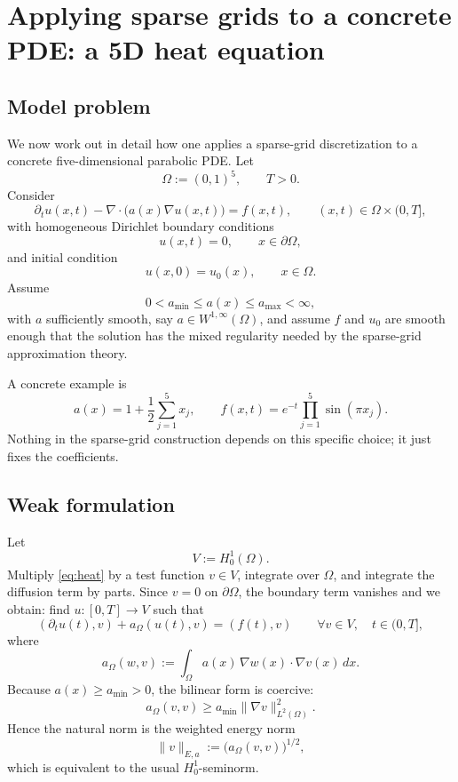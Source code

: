 \documentclass[11pt,a4paper]{report}
\begin{document}
\chapter{Applying sparse grids to a concrete PDE: a 5D heat equation}

\section{Model problem}

We now work out in detail how one applies a sparse-grid discretization to a concrete five-dimensional parabolic PDE. Let
$$
\Omega := (0,1)^5,
\qquad
T>0.
$$
Consider
\begin{equation}
\partial_t u(x,t) - \nabla\cdot\bigl(a(x)\nabla u(x,t)\bigr) = f(x,t),
\qquad (x,t)\in \Omega\times(0,T],
\label{eq:heat}
\end{equation}
with homogeneous Dirichlet boundary conditions
$$
u(x,t)=0,
\qquad x\in\partial\Omega,
$$
and initial condition
$$
u(x,0)=u_0(x), \qquad x\in\Omega.
$$
Assume
$$
0<a_{\min}\le a(x)\le a_{\max}<\infty,
$$
with $a$ sufficiently smooth, say $a\in W^{1,\infty}(\Omega)$, and assume $f$ and $u_0$ are smooth enough that the solution has the mixed regularity needed by the sparse-grid approximation theory.

A concrete example is
$$
a(x)=1+\frac12\sum_{j=1}^5 x_j,
\qquad
f(x,t)=e^{-t}\prod_{j=1}^5 \sin(\pi x_j).
$$
Nothing in the sparse-grid construction depends on this specific choice; it just fixes the coefficients.

\section{Weak formulation}

Let
$$
V:=H_0^1(\Omega).
$$
Multiply \eqref{eq:heat} by a test function $v\in V$, integrate over $\Omega$, and integrate the diffusion term by parts. Since $v=0$ on $\partial\Omega$, the boundary term vanishes and we obtain:
find $u:[0,T]\to V$ such that
\begin{equation}
(\partial_t u(t),v) + a_\Omega(u(t),v) = (f(t),v)
\qquad \forall v\in V,\quad t\in(0,T],
\label{eq:weak}
\end{equation}
where
$$
a_\Omega(w,v)
:=
\int_\Omega a(x)\,\nabla w(x)\cdot \nabla v(x)\,dx.
$$
Because $a(x)\ge a_{\min}>0$, the bilinear form is coercive:
$$
a_\Omega(v,v)\ge a_{\min}\|\nabla v\|_{L^2(\Omega)}^2.
$$
Hence the natural norm is the weighted energy norm
$$
\|v\|_{E,a}
:=
\bigl(a_\Omega(v,v)\bigr)^{1/2},
$$
which is equivalent to the usual $H_0^1$-seminorm.
\end{document}
